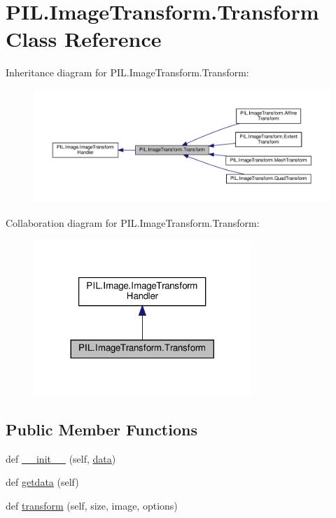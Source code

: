 \hypertarget{classPIL_1_1ImageTransform_1_1Transform}{}\section{P\+I\+L.\+Image\+Transform.\+Transform Class Reference}
\label{classPIL_1_1ImageTransform_1_1Transform}


Inheritance diagram for P\+I\+L.\+Image\+Transform.\+Transform\+:
\nopagebreak
\begin{figure}[H]
\begin{center}
\leavevmode
\includegraphics[width=350pt]{classPIL_1_1ImageTransform_1_1Transform__inherit__graph}
\end{center}
\end{figure}


Collaboration diagram for P\+I\+L.\+Image\+Transform.\+Transform\+:
\nopagebreak
\begin{figure}[H]
\begin{center}
\leavevmode
\includegraphics[width=233pt]{classPIL_1_1ImageTransform_1_1Transform__coll__graph}
\end{center}
\end{figure}
\subsection*{Public Member Functions}
\begin{DoxyCompactItemize}
\item 
def \hyperlink{classPIL_1_1ImageTransform_1_1Transform_a2be9c0964e43d3a31752622d7800d0ac}{\+\_\+\+\_\+init\+\_\+\+\_\+} (self, \hyperlink{classPIL_1_1ImageTransform_1_1Transform_a953d81d52179df7ed0d2a55268d83207}{data})
\item 
def \hyperlink{classPIL_1_1ImageTransform_1_1Transform_a1d8a79fd3d00a6ea37d9954994262711}{getdata} (self)
\item 
def \hyperlink{classPIL_1_1ImageTransform_1_1Transform_ac0b352a6d2d2f6f05c8bd44c19478d3c}{transform} (self, size, image, options)
\end{DoxyCompactItemize}
